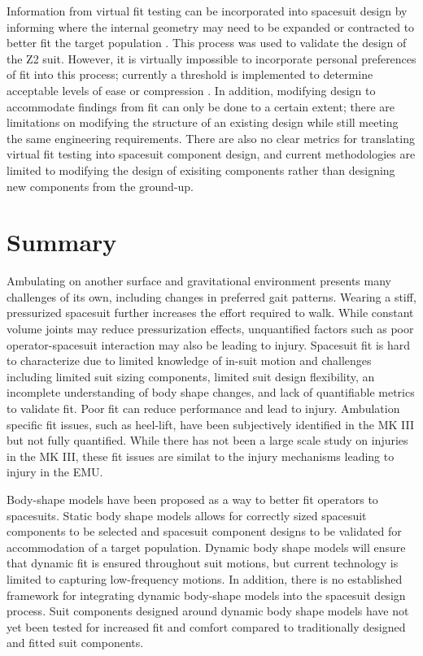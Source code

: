 \documentclass[defaultstyle,11pt]{comps}
\begin{document}
Information from virtual fit testing can be incorporated into spacesuit design by informing where the internal geometry may need to be expanded or contracted to better fit the target population \citep{Kim2019}.
This process was used to validate the design of the Z2 suit.
However, it is virtually impossible to incorporate personal preferences of fit into this process; currently a threshold is implemented to determine acceptable levels of ease or compression \citep{Kim2019}.
In addition, modifying design to accommodate findings from fit can only be done to a certain extent; there are limitations on modifying the structure of an existing design while still meeting the same engineering requirements.
There are also no clear metrics for translating virtual fit testing into spacesuit component design, and current methodologies are limited to modifying the design of exisiting components rather than designing new components from the ground-up.

\hypertarget{summary-1}{%
\section{Summary}\label{summary-1}}

Ambulating on another surface and gravitational environment presents many challenges of its own, including changes in preferred gait patterns.
Wearing a stiff, pressurized spacesuit further increases the effort required to walk.
While constant volume joints may reduce pressurization effects, unquantified factors such as poor operator-spacesuit interaction may also be leading to injury.
Spacesuit fit is hard to characterize due to limited knowledge of in-suit motion and challenges including limited suit sizing components, limited suit design flexibility, an incomplete understanding of body shape changes, and lack of quantifiable metrics to validate fit.
Poor fit can reduce performance and lead to injury.
Ambulation specific fit issues, such as heel-lift, have been subjectively identified in the MK III but not fully quantified.
While there has not been a large scale study on injuries in the MK III, these fit issues are similat to the injury mechanisms leading to injury in the EMU.

Body-shape models have been proposed as a way to better fit operators to spacesuits.
Static body shape models allows for correctly sized spacesuit components to be selected and spacesuit component designs to be validated for accommodation of a target population.
Dynamic body shape models will ensure that dynamic fit is ensured throughout suit motions, but current technology is limited to capturing low-frequency motions.
In addition, there is no established framework for integrating dynamic body-shape models into the spacesuit design process.
Suit components designed around dynamic body shape models have not yet been tested for increased fit and comfort compared to traditionally designed and fitted suit components.
\end{document}
